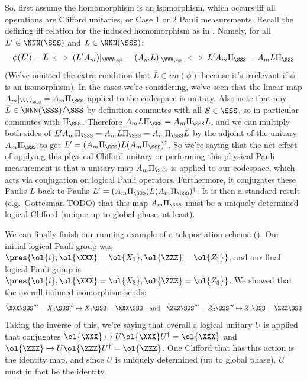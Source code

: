 So, first assume the homomorphism is an isomorphism, which occurs iff all operations are Clifford unitaries, or Case 1 or 2 Pauli measurements.
Recall the defining iff relation for the induced homomorphism as in .
Namely, for all $L' \in \NNN(\SSS)$ and $L \in \NNN(\SSS)$:
\begin{equation}
    \phi(\overline{L'}) = \overline{L}
    \iff (L' A_m)|_{\VVV_\SSS} = (A_m L)|_{\VVV_\SSS}
    \iff L' A_m \Pi_{\SSS} = A_m L \Pi_{\SSS}
\end{equation}
(We've omitted the extra condition that $\overline{L} \in im(\phi)$ because it's irrelevant if $\phi$ is an isomorphism).
In the cases we're considering, we've seen that the linear map $A_m|_{\VVV_\SSS} = A_m \Pi_\SSS$ applied to the codespace is unitary.
Also note that any $\overline{L} \in \NNN(\SSS)/\SSS$ by definition commutes with all $S \in \SSS$, so in particular commutes with $\Pi_\SSS$.
Therefore $A_m L \Pi_{\SSS} = A_m \Pi_{\SSS} L$, and we can multiply both sides of $L' A_m \Pi_{\SSS} = A_m L \Pi_{\SSS} = A_m \Pi_{\SSS} L$ by the adjoint of the unitary $A_m \Pi_\SSS$ to get $L' = (A_m \Pi_{\SSS}) L (A_m \Pi_{\SSS})^\dagger$.
So we're saying that the net effect of applying this physical Clifford unitary or performing this physical Pauli measurement is that a unitary map $A_m \Pi_{\SSS}$ is applied to our codespace, which acts via conjugation on logical Pauli operators.
Furthermore, it conjugates these Paulis $L$ back to Paulis $L' = (A_m \Pi_{\SSS}) L (A_m \Pi_{\SSS})^\dagger$.
It is then a standard result (e.g.\ Gottesman TODO) that this map $A_m \Pi_{\SSS}$ must be a uniquely determined logical Clifford (unique up to global phase, at least).

\begin{example}\label{ex:teleportation_logical_clifford}
    We can finally finish our running example of a teleportation scheme ().
    Our initial logical Pauli group was $\pres{\ol{i}, \ol{\XXX} = \ol{X_1}, \ol{\ZZZ} = \ol{Z_1}}$, and our final logical Pauli group is $\pres{\ol{i}, \ol{\XXX} = \ol{X_3}, \ol{\ZZZ} = \ol{Z_3}}$.
    We showed that the overall induced isomorphism sends:
    \begin{equation}
        \XXX\SSS''' = X_3\SSS''' \mapsto X_1\SSS = \XXX\SSS
        \quad\text{and}\quad
        \ZZZ\SSS''' = Z_3\SSS''' \mapsto Z_1\SSS = \ZZZ\SSS
    \end{equation}
    Taking the inverse of this, we're saying that overall a logical unitary $U$ is applied that conjugates $\ol{\XXX} \mapsto U\ol{\XXX} U^\dagger = \ol{\XXX}$ and $\ol{\ZZZ} \mapsto U\ol{\ZZZ} U^\dagger = \ol{\ZZZ}$.
    One Clifford that has this action is the identity map, and since $U$ is uniquely determined (up to global phase), $U$ must in fact be the identity.
\end{example}

